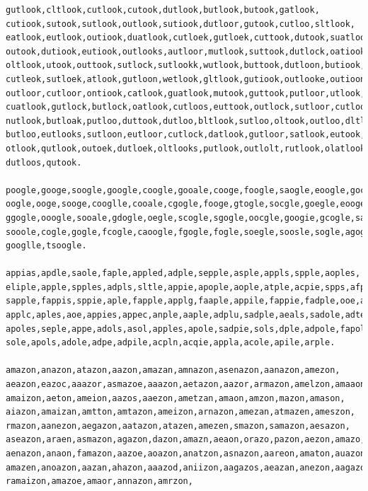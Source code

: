 \begin{verbatim}
gutlook,cltlook,cutlook,cutook,dutlook,butlook,butook,gatlook,
cutiook,sutook,sutlook,outlook,sutiook,dutloor,gutook,cutloo,sltlook,
eatlook,eutlook,outiook,duatlook,cutloek,gutloek,cuttook,dutook,suatlook,
outook,dutiook,eutiook,outlooks,autloor,mutlook,suttook,dutlock,oatiook,
oltlook,utook,outtook,sutlock,sutlookk,wutlook,buttook,dutloon,butiook,
cutleok,sutloek,atlook,gutloon,wetlook,gltlook,gutiook,outlooke,outioon,
outloor,cutloor,ontiook,catlook,guatlook,mutook,guttook,putloor,utlook,
cuatlook,gutlock,butlock,oatlook,cutloos,euttook,outlock,sutloor,cutloon,
nutlook,butloak,putloo,duttook,dutloo,bltlook,sutloo,oltook,outloo,dltlook,
butloo,eutlooks,sutloon,eutloor,cutlock,datlook,gutloor,satlook,eutook,
otlook,qutlook,outoek,dutloek,oltlooks,putlook,outlolt,rutlook,olatlook,
dutloos,qutook.

poogle,googe,soogle,google,coogle,gooale,cooge,foogle,saogle,eoogle,gocgle,
oogle,ooge,sooge,cooglle,cooale,cgogle,fooge,gtogle,socgle,goegle,eooge,
ggogle,ooogle,sooale,gdogle,oegle,scogle,sgogle,oocgle,googie,gcogle,saoogle,
sooole,cogle,gogle,fcogle,caoogle,fgogle,fogle,soegle,soosle,sogle,agogle,
googlle,tsoogle.

appias,apdle,saole,faple,appled,adple,sepple,asple,appls,spple,aoples,
eliple,apple,spples,adpls,sltle,appie,apople,aople,atple,acpie,spps,afple,
sapple,fappis,sppie,aple,fapple,applg,faaple,appile,fappie,fadple,ooe,aepie,
applc,aples,aoe,appies,appec,anple,aaple,adplu,sadple,aeals,sadole,adte,
apoles,seple,appe,adols,asol,apples,apole,sadpie,sols,dple,adpole,fapole,
sole,apols,adole,adpe,adpile,acpln,acqie,appla,acole,apile,arple.

amazon,anazon,atazon,aazon,amazan,amnazon,asenazon,aanazon,amezon,
aeazon,eazoc,aaazor,asmazoe,aaazon,aetazon,aazor,armazon,amelzon,amaaon,
amaizon,aeton,ameion,aazos,aaezon,ametzan,amaon,amzon,mazon,amason,
aiazon,amaizan,amtton,amtazon,ameizon,arnazon,amezan,atmazen,ameszon,
rmazon,aanezon,aegazon,aatazon,atazen,amezen,smazon,samazon,aesazon,
aseazon,araen,asmazon,agazon,dazon,amazn,aeaon,orazo,pazon,aezon,amazo,atmazon,
aenazon,anaon,famazon,aazoe,aoazon,anatzon,asnazon,aareon,amaton,auazon,
amazen,anoazon,aazan,ahazon,aaazod,aniizon,aagazos,aeazan,anezon,aagazoen,
ramaizon,amazoe,amaor,annazon,amrzon,
\end{verbatim}


